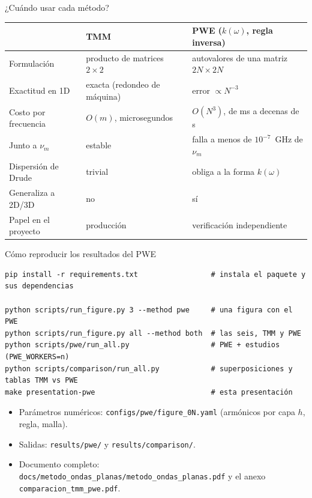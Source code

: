 \documentclass[aspectratio=169,10pt]{beamer}
\newcommand{\num}{\nu_m}
\begin{document}
\begin{frame}{¿Cuándo usar cada método?}
  \centering
  \small
  \begin{tabular}{lll}
    \toprule
    & TMM & PWE ($k(\omega)$, regla inversa) \\
    \midrule
    Formulación & producto de matrices $2\times2$ & autovalores de una matriz $2N\times2N$ \\
    Exactitud en 1D & exacta (redondeo de máquina) & error $\propto N^{-3}$ \\
    Costo por frecuencia & $O(m)$, microsegundos & $O(N^3)$, de ms a decenas de s \\
    Junto a $\num$ & estable & falla a menos de $10^{-7}$~GHz de $\num$ \\
    Dispersión de Drude & trivial & obliga a la forma $k(\omega)$ \\
    Generaliza a 2D/3D & no & sí \\
    Papel en el proyecto & producción & verificación independiente \\
    \bottomrule
  \end{tabular}
\end{frame}

\begin{frame}[fragile]{Cómo reproducir los resultados del PWE}
\footnotesize
\begin{verbatim}
pip install -r requirements.txt                 # instala el paquete y sus dependencias

python scripts/run_figure.py 3 --method pwe     # una figura con el PWE
python scripts/run_figure.py all --method both  # las seis, TMM y PWE
python scripts/pwe/run_all.py                   # PWE + estudios (PWE_WORKERS=n)
python scripts/comparison/run_all.py            # superposiciones y tablas TMM vs PWE
make presentation-pwe                           # esta presentación
\end{verbatim}
  \vspace{0.3em}
  \small
  \begin{itemize}
    \item Parámetros numéricos: \texttt{configs/pwe/figure\_0N.yaml} (armónicos por capa $h$, regla, malla).
    \item Salidas: \texttt{results/pwe/} y \texttt{results/comparison/}.
    \item Documento completo: \texttt{docs/metodo\_ondas\_planas/metodo\_ondas\_planas.pdf} y el anexo
      \texttt{comparacion\_tmm\_pwe.pdf}.
  \end{itemize}
\end{frame}
\end{document}
